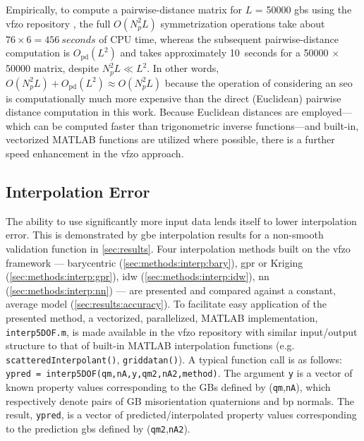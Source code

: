 \documentclass[final,twocolumn,12pt]{elsarticle}
\newcommand{\matlab}[1]{\mbox{\lstinline[style=Matlab-editor]{#1}}}
\newcommand{\outpt}{prediction}
\newcommand{\vfzorepo}{\gls{vfzo} repository}
\newcommand{\symtime}{76}
\begin{document}
Empirically, to compute a pairwise-distance matrix for $L$ = \num{50000} \glspl{gb} using the \vfzorepo{} \cite{bairdFiveDegreeofFreedom5DOF2020}, the full $O(N_p^2L)$ symmetrization operations take about $\symtime{}\times 6 = \SI{456}{seconds}$ of CPU time, whereas the subsequent pairwise-distance computation is $O_{\text{pd}}(L^2)$ and takes approximately \SI{10}{seconds} for a \num{50000} $\times$ \num{50000} matrix, despite $N_p^2L \ll L^2$. In other words, $O(N_p^2L)+O_\text{pd}(L^2)\approx O(N_p^2L)$  because the operation of considering an \gls{seo} is computationally much more expensive than the direct (Euclidean) pairwise distance computation in this work. Because Euclidean distances are employed---which can be computed faster than trigonometric inverse functions---and built-in, vectorized MATLAB functions are utilized where possible, there is a further speed enhancement in the \gls{vfzo} approach. %


\subsection{Interpolation Error} \label{sec:intro:interp-error}
The ability to use significantly more input data lends itself to lower interpolation error. This is demonstrated by \gls{gbe} interpolation results for a non-smooth validation function in \cref{sec:results}.
Four interpolation methods built on the \gls{vfzo} framework --- barycentric (\cref{sec:methods:interp:bary}), \gls{gpr} or Kriging (\cref{sec:methods:interp:gpr}), \gls{idw} (\cref{sec:methods:interp:idw}), \gls{nn} (\cref{sec:methods:interp:nn}) --- are presented and compared against a constant, average model (\cref{sec:results:accuracy}). To facilitate easy application of the presented method, a vectorized, parallelized, MATLAB implementation, \matlab{interp5DOF.m}, is made available in the \vfzorepo{} \cite{bairdFiveDegreeofFreedom5DOF2020} with similar input/output structure to that of built-in MATLAB interpolation functions (e.g. \matlab{scatteredInterpolant()}, \matlab{griddatan()}). A typical function call is as follows: \matlab{ypred = interp5DOF(qm,nA,y,qm2,nA2,method)}. The argument \matlab{y} is a vector of known property values corresponding to the GBs defined by (\matlab{qm},\matlab{nA}), which respectively denote pairs of GB misorientation quaternions and \gls{bp} normals. The result, \matlab{ypred}, is a vector of predicted/interpolated property values corresponding to the \outpt{} \glspl{gb} defined by (\matlab{qm2},\matlab{nA2}). %
\end{document}
